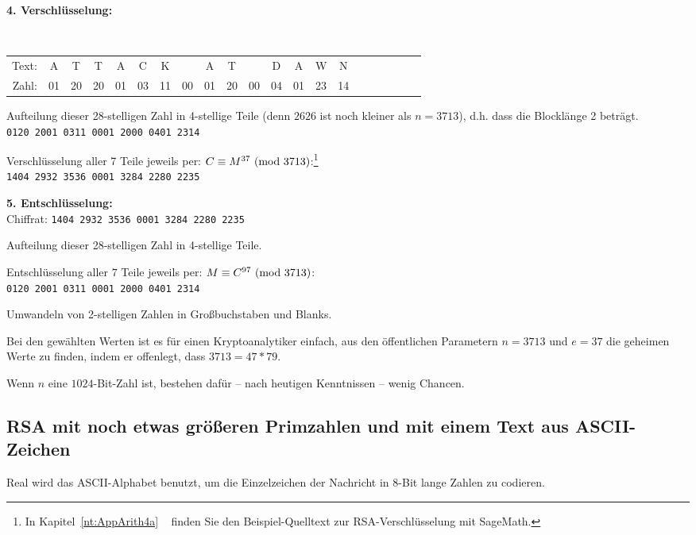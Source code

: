 \begin{refsegment}
 \textbf{4. Verschlüsselung:}\\
{\tt
\begin{tabular}{rcccccccccccccccccccc}
{\rm Text:} & A & T & T & A & C & K & & A & T &  & D & A & W & N\\
{\rm Zahl:} & 01 & 20 & 20 & 01 & 03 & 11 & 00 & 01 & 20 & 00 & 04 & 01 & 23 & 14
\end{tabular}
}

 Aufteilung dieser 28-stelligen Zahl in 4-stellige Teile (denn $2626$ ist noch kleiner als $n=3713$), d.h. dass
die Blocklänge 2 beträgt.\\
{\tt 0120 2001 0311 0001 2000 0401 2314}

\label{SrcArith4a}
 Verschlüsselung aller 7 Teile jeweils per: $C \equiv M^{37}{\rm ~(mod~3713)}$:\footnote{%
  In Kapitel~\ref{nt:AppArith4a} \glqq {}\grqq~
  finden Sie den Beispiel-Quelltext zur RSA-Verschlüsselung mit SageMath.
}\\
{\tt 1404 2932 3536 0001 3284 2280 2235}

 \textbf{5. Entschlüsselung:}\\
Chiffrat: {\tt 1404 2932 3536 0001 3284 2280 2235 }

 Aufteilung dieser 28-stelligen Zahl in 4-stellige Teile.

 Entschlüsselung aller $7$ Teile jeweils per: $M \equiv C^{97}{\rm ~(mod~}3713)$:\\
{\tt 0120 2001 0311 0001 2000 0401 2314}

 Umwandeln von 2-stelligen Zahlen in Großbuchstaben und Blanks.

 Bei den gewählten Werten ist es für einen Kryptoanalytiker
 einfach, aus den öffentlichen Parametern
$n=3713$ und $e=37$ die geheimen Werte zu finden, indem
er offenlegt, dass $3713 = 47 * 79$.

 Wenn $n$ eine $1024$-Bit-Zahl ist, bestehen dafür -- nach heutigen
Kenntnissen -- wenig Chancen.


\subsection[RSA mit noch etwas größeren Primzahlen und ASCII-Zeichen]
           {RSA mit noch etwas größeren Primzahlen und mit einem Text aus ASCII-Zeichen}

Real wird das ASCII-Alphabet benutzt, um die Einzelzeichen der Nachricht in
8-Bit lange Zahlen zu codieren.


\end{refsegment}
